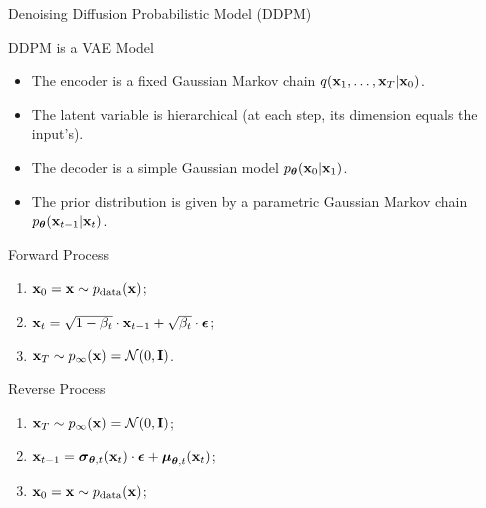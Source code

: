 \documentclass{beamer}
\begin{document}
\begin{frame}{Denoising Diffusion Probabilistic Model (DDPM)}
    \begin{block}{DDPM is a VAE Model}
        \begin{itemize}
            \item The encoder is a fixed Gaussian Markov chain $q(\mathbf{x}_1, \dots, \mathbf{x}_T | \mathbf{x}_0)$.
            \item The latent variable is hierarchical (at each step, its dimension equals the input's).
            \item The decoder is a simple Gaussian model $p_{\boldsymbol{\theta}}(\mathbf{x}_0 | \mathbf{x}_1)$.
            \item The prior distribution is given by a parametric Gaussian Markov chain $p_{\boldsymbol{\theta}}(\mathbf{x}_{t-1} | \mathbf{x}_t)$.
        \end{itemize}
    \end{block}
    \eqpause
    \begin{minipage}{0.5\linewidth}
        \begin{block}{Forward Process}
            \begin{enumerate}
                \item $\mathbf{x}_0 = \mathbf{x} \sim p_{\text{data}}(\mathbf{x})$;
                \item $\mathbf{x}_t = \sqrt{1 - \beta_t} \cdot \mathbf{x}_{t - 1} + \sqrt{\beta_t} \cdot \boldsymbol{\epsilon}$;
                \item $\mathbf{x}_T \sim p_{\infty}(\mathbf{x}) = \mathcal{N}(0, \mathbf{I})$.
            \end{enumerate}
        \end{block}
    \end{minipage}%
    \eqpause
    \begin{minipage}{0.55\linewidth}
        \begin{block}{Reverse Process}
            \begin{enumerate}
                \item $\mathbf{x}_T \sim p_{\infty}(\mathbf{x}) = \mathcal{N}(0, \mathbf{I})$;
                \item $\mathbf{x}_{t - 1} = \boldsymbol{\sigma}_{\boldsymbol{\theta}, t}(\mathbf{x}_t) \cdot \boldsymbol{\epsilon} + \boldsymbol{\mu}_{\boldsymbol{\theta}, t}(\mathbf{x}_t)$;
                \item $\mathbf{x}_0 = \mathbf{x} \sim p_{\text{data}}(\mathbf{x})$;
            \end{enumerate}
        \end{block}
    \end{minipage}
\end{frame}
\end{document}
